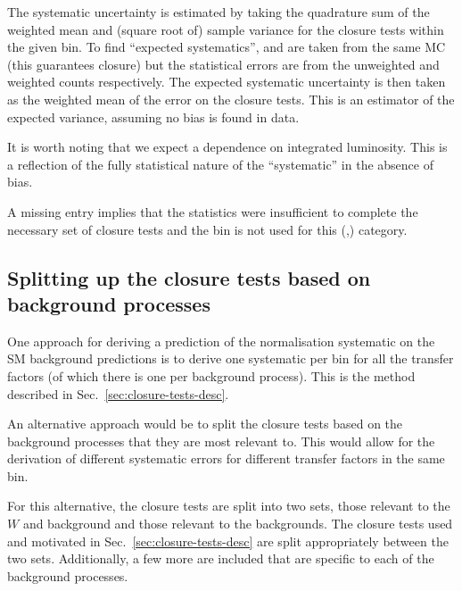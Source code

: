 The systematic uncertainty is estimated by taking the quadrature sum
of the weighted mean and (square root of) sample variance for the
closure tests within the given \scalht bin. To find ``expected
systematics'', \nobs and \npre are taken from the same MC
(this guarantees closure) but the statistical errors are from the
unweighted and weighted counts respectively. The expected systematic
uncertainty is then taken as the weighted mean of the error on the
closure tests. This is an estimator of the expected variance, assuming
no bias is found in data. 

It is worth noting that we expect a dependence on integrated
luminosity. This is a
reflection of the fully statistical nature of the ``systematic'' in
the absence of bias. 

A missing entry implies that the statistics were
insufficient to complete the necessary set of closure tests and the
\scalht bin is not used for this (\njet,\nb) category. 


\subsection{Splitting up the closure tests based on background
processes \label{sec:closure-split}}

One approach for deriving a prediction of the normalisation systematic
on the SM background predictions is to derive one systematic per bin
for all the transfer factors (of which there is one per background process). This is the 
method described in Sec.~\ref{sec:closure-tests-desc}.

An alternative approach would be to split the closure tests based on
the background processes that they are most relevant to. This would
allow for the derivation of different systematic errors for different
transfer factors in the same bin.

For this alternative, the closure tests are split into
two sets, those relevant to the $W$ and \ttbar background and those relevant
to the \znunu backgrounds. The closure tests used and motivated in
Sec.~\ref{sec:closure-tests-desc} are split appropriately between the
two sets. Additionally, a few more are included that are specific to each of
the background processes.

